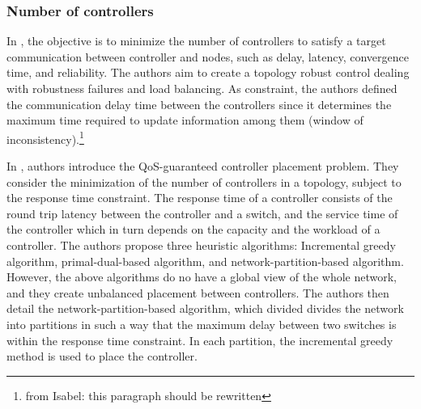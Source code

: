 \documentclass{IEEEtran}
\newcommand\fia[1]{{\color{red}\footnote{\color{red}from Isabel: #1}}} %
\newcommand\mia[1]{{\color{red}#1}}%
\newcommand\delia[1]{{\tiny{\color{red}#1}}} %
\begin{document}
\subsubsection{Number of controllers}


In \cite{JiCe14}, the objective is to minimize the number of controllers to satisfy a target communication between controller and nodes, such as delay, latency, convergence time, and reliability. The authors aim to create a topology robust control dealing with robustness failures and load balancing. As constraint, the authors defined the communication delay time between the controllers since it  determines the maximum time required to update information among them (window of inconsistency).\fia{this paragraph should be rewritten} %

In \cite{ChWa15}, authors  introduce the QoS-guaranteed controller placement problem. They consider the minimization of the number of controllers in a topology, subject to the response time constraint. The response time of a controller consists of the round trip latency between the controller and a switch, and the service time of the controller which \mia{in turn} depends on the capacity and the workload of a controller. The authors propose three heuristic algorithms: Incremental greedy algorithm, primal-dual-based algorithm, and network-partition-based algorithm. However, the above algorithms do no have a global view of the whole network, and they create unbalanced placement between controllers. The authors then detail the network-partition-based algorithm, which \delia{divided} \mia{divides} the network into partitions in \mia{such} a way that the maximum delay between two switches is within the response time constraint. In each partition, the incremental greedy method is used to place the controller.%
\end{document}
